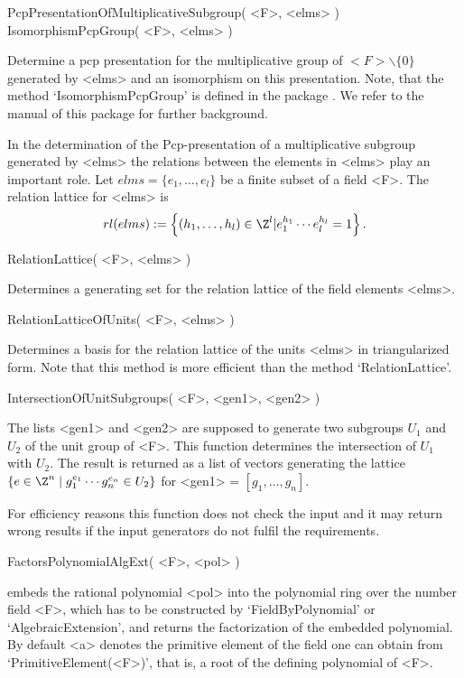 \> PcpPresentationOfMultiplicativeSubgroup( <F>, <elms> )
\> IsomorphismPcpGroup( <F>, <elms> )

Determine a pcp presentation for the multiplicative group of
$<F>\backslash\{0\}$ generated by
<elms> and an isomorphism on this presentation. 
Note, that the method `IsomorphismPcpGroup' is defined in the
{\Polycyclic} package \cite{Polycyclic}. We refer to the manual of this
package for further background. 

In the determination of the Pcp-presentation of a multiplicative
subgroup generated by <elms> the relations between the elements in
<elms> play an important role.
Let $elms=\{e_1,\dots,e_l\}$ be a finite subset of a field <F>.
The relation lattice for <elms> is 
$$
rl(elms):=\left\{(h_1,\dots,h_l) \in \Z^l | e_1^{h_1} \cdots
e_l^{h_l} = 1\right\} .
$$

\> RelationLattice( <F>, <elms> )

Determines a generating set 
for the relation lattice of the field elements <elms>.
 

\> RelationLatticeOfUnits( <F>, <elms> )

Determines a basis for the relation lattice of the units <elms> in 
triangularized form. Note that this method is more efficient than 
the method `RelationLattice'.

\> IntersectionOfUnitSubgroups( <F>, <gen1>, <gen2> )

The lists <gen1> and <gen2> are supposed to generate two subgroups 
$U_1$ and $U_2$ of the unit group of <F>. This function determines 
the intersection of $U_1$ with $U_2$. The result is returned as a 
list of vectors generating the lattice $\{ e \in \Z^n \mid g_1^{e_1} 
\cdots g_n^{e_n} \in U_2 \}$ for <gen1> = $[g_1, \ldots, g_n]$.

For efficiency reasons this function does not check the input and it 
may return wrong results if the input generators do not fulfil the 
requirements.



\> FactorsPolynomialAlgExt( <F>, <pol> )

embeds the rational polynomial <pol> into the polynomial ring over the
number field <F>, which has to be constructed by `FieldByPolynomial'
or `AlgebraicExtension', and returns the factorization of the embedded
polynomial.  By default <a> denotes the primitive element of the field
one can obtain from `PrimitiveElement(<F>)', that is, a root of the
defining polynomial of <F>. 

